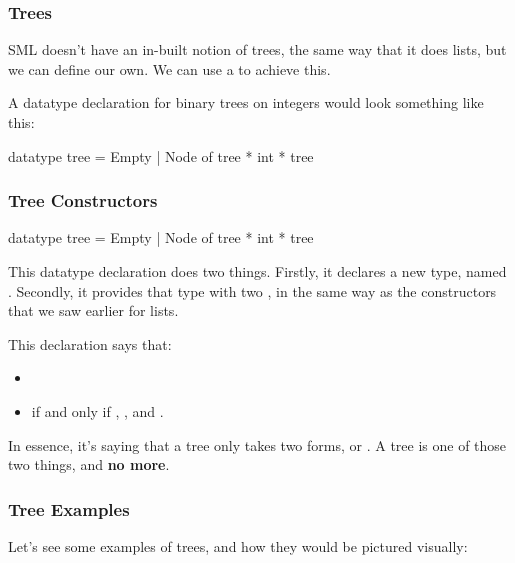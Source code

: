 \documentclass[aspectratio=169]{beamer}
\begin{document}
\begin{frame}[fragile]
  \frametitle{Trees}

  SML doesn't have an in-built notion of trees, the same way that it does lists, but we can
  define our own. We can use a  to achieve this.

  \vspace{\fill}


  \vspace{\fill}

  A datatype declaration for binary trees on integers would look something like this:
  \begin{codeblock}
    datatype tree = Empty | Node of tree * int * tree
  \end{codeblock}
\end{frame}

\begin{frame}[fragile]
  \frametitle{Tree Constructors}

  \begin{codeblock}
    datatype tree = Empty | Node of tree * int * tree
  \end{codeblock}
  
  \vspace{\fill}

  This datatype declaration does two things. Firstly, it declares a new type, named .
  Secondly, it provides that type with two , in the same way as the constructors 
  that we saw earlier for lists.

  \vspace{\fill}

  This declaration says that:
  \begin{itemize}
    \item {}
    \item {} if and only if , , and .
  \end{itemize}

  \vspace{\fill}

  In essence, it's saying that a tree only takes two forms,  or . A tree
  is one of those two things, and \textbf{no more}.
\end{frame}

\begin{frame}[fragile]
  \frametitle{Tree Examples}

  Let's see some examples of trees, and how they would be pictured visually:




\end{frame}
\end{document}
